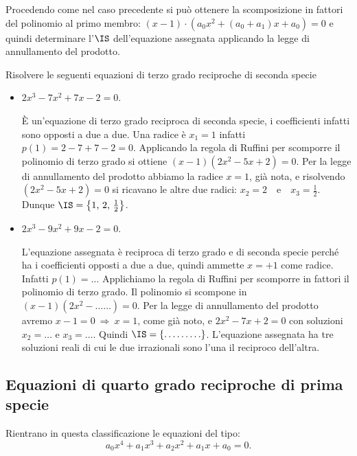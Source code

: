 Procedendo come nel caso precedente si può ottenere la scomposizione in fattori del polinomio al primo membro: $(x-1)\cdot \left(a_0x^2+(a_0+a_1)x+a_0\right)=0$ e quindi determinare l'$\IS$ dell'equazione assegnata applicando la legge di annullamento del prodotto.
\begin{exrig}
 \begin{esempio}
 Risolvere le seguenti equazioni di terzo grado reciproche di seconda specie

 \begin{itemize}
 \item $ 2x^3-7x^2+7x-2=0 $.

 \`E un'equazione di terzo grado reciproca di seconda specie, i coefficienti infatti sono opposti a due a due. Una radice è $x_1=1$ infatti $p(1)=2-7+7-2=0$. Applicando la regola di Ruffini per scomporre il polinomio di terzo grado si ottiene $(x-1)\left(2x^2-5x+2\right)=0$. Per la legge di annullamento del prodotto abbiamo la radice $x=1$, già nota, e risolvendo $\left(2x^2-5x+2\right)=0$ si ricavano le altre due radici: $x_2=2$~~e~~$x_3=\frac 1 2$. Dunque $\IS=\left\{1\text{, }2\text{, }\frac 1 2\right\}$.

 \item $ 2x^3-9x^2+9x-2=0 $.

 L'equazione assegnata è reciproca di terzo grado e di seconda specie perché ha i coefficienti opposti a due a due, quindi ammette $x=+1$ come radice. Infatti $p(1)=\ldots$
 Applichiamo la regola di Ruffini per scomporre in fattori il polinomio di terzo grado. Il polinomio si scompone in $(x-1)\left(2x^2- \ldots \ldots\right)=0$. Per la legge di annullamento del prodotto avremo $x-1=0\:\Rightarrow\: x=1$, come già noto, e $2x^2-7x+2=0$ con soluzioni $x_2=\ldots $ e $x_3=\ldots $. Quindi $\IS=\{\ldots \ldots \ldots \}$. L'equazione assegnata ha tre soluzioni reali di cui le due irrazionali sono l'una il reciproco dell'altra.
 \end{itemize}
 \end{esempio}
\end{exrig}
\ovalbox{\risolvii \ref{ese:5.40}, \ref{ese:5.41}, \ref{ese:5.42}}

\subsection{Equazioni di quarto grado reciproche di prima specie}

Rientrano in questa classificazione le equazioni del tipo: \[a_0x^4+a_1x^3+a_2x^2+a_1x+a_0=0.\]

